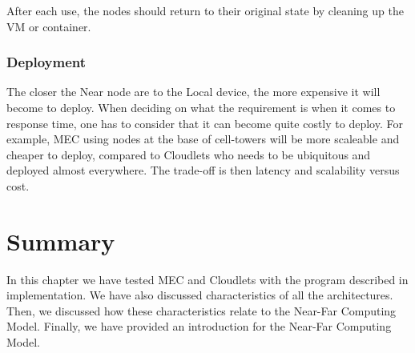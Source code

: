 After each use, the nodes should return to their original state by cleaning up the VM or container.


\subsubsection{Deployment}
The closer the Near node are to the Local device, the more expensive it will become to deploy. When deciding on what the requirement is when it comes to response time, one has to consider that it can become quite costly to deploy. For example, MEC using nodes at the base of cell-towers will be more scaleable and cheaper to deploy, compared to Cloudlets who needs to be ubiquitous and deployed almost everywhere. The trade-off is then latency and scalability versus cost. 



\section{Summary}
In this chapter we have tested MEC and Cloudlets with the program described in implementation. We have also discussed characteristics of all the architectures. Then, we discussed how these characteristics relate to the Near-Far Computing Model. Finally, we have provided an introduction for the Near-Far Computing Model.





